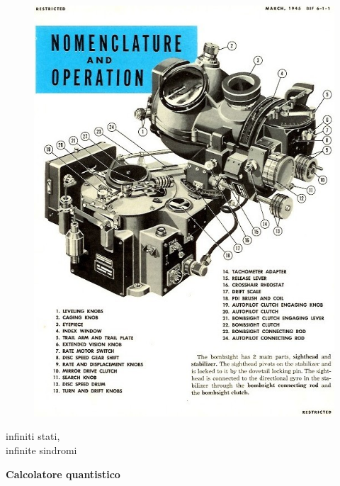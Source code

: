 \documentclass[aspectratio=169]{beamer}
\begin{document}
\begin{frame}
\begin{minipage}{0.32\textwidth}
\begin{figure}
			\includegraphics[scale=0.175]{analogico.jpg}
		\end{figure}
		infiniti stati, \\
		infinite sindromi
	\end{minipage}
	\pause
	\begin{minipage}{0.32\textwidth}
		\centering
		\textbf{Calcolatore quantistico}
		\begin{figure}

\end{figure}
\end{minipage}
\end{frame}
\end{document}
